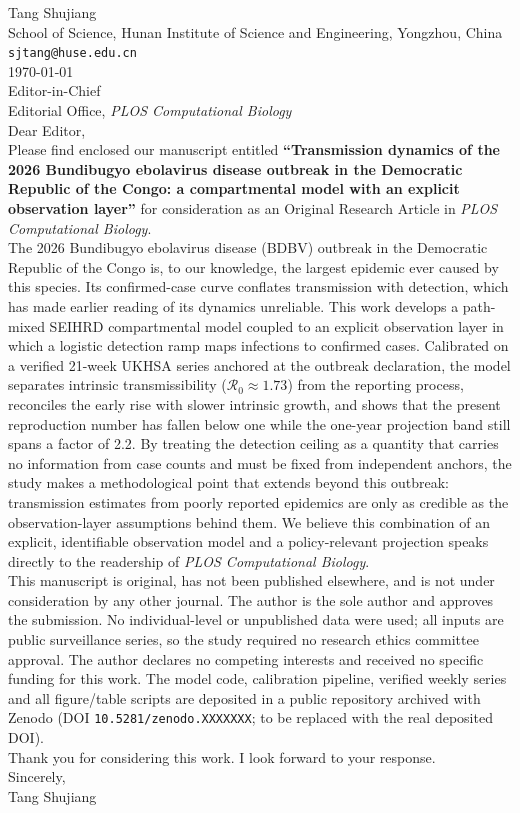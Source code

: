 \documentclass[11pt]{article}
\newcommand{\Reff}{\mathcal{R}}
\begin{document}
\noindent Tang Shujiang\\
School of Science, Hunan Institute of Science and Engineering, Yongzhou, China\\
\texttt{sjtang@huse.edu.cn}\\[1em]

\noindent \today\\[1em]

\noindent Editor-in-Chief\\
Editorial Office, \emph{PLOS Computational Biology}\\[1em]

\noindent Dear Editor,\\[1em]

\noindent Please find enclosed our manuscript entitled \textbf{``Transmission
dynamics of the 2026 Bundibugyo ebolavirus disease outbreak in the
Democratic Republic of the Congo: a compartmental model with an explicit
observation layer''} for consideration as an Original Research Article in
\emph{PLOS Computational Biology}.\\[1em]

The 2026 Bundibugyo ebolavirus disease (BDBV) outbreak in the Democratic
Republic of the Congo is, to our knowledge, the largest epidemic ever
caused by this species. Its confirmed-case curve conflates transmission
with detection, which has made earlier reading of its dynamics unreliable.
This work develops a path-mixed SEIHRD compartmental model coupled to an
explicit observation layer in which a logistic detection ramp maps
infections to confirmed cases. Calibrated on a verified 21-week UKHSA
series anchored at the outbreak declaration, the model separates
intrinsic transmissibility ($\Reff_0\approx1.73$) from the reporting
process, reconciles the early rise with slower intrinsic growth, and shows
that the present reproduction number has fallen below one while the
one-year projection band still spans a factor of 2.2. By treating the
detection ceiling as a quantity that carries no information from case
counts and must be fixed from independent anchors, the study makes a
methodological point that extends beyond this outbreak: transmission
estimates from poorly reported epidemics are only as credible as the
observation-layer assumptions behind them. We believe this combination of
an explicit, identifiable observation model and a policy-relevant
projection speaks directly to the readership of \emph{PLOS Computational
Biology}.\\[1em]

This manuscript is original, has not been published elsewhere, and is not
under consideration by any other journal. The author is the sole author
and approves the submission. No individual-level or unpublished data were
used; all inputs are public surveillance series, so the study required no
research ethics committee approval. The author declares no competing
interests and received no specific funding for this work. The model code,
calibration pipeline, verified weekly series and all figure/table scripts
are deposited in a public repository archived with Zenodo
(DOI \texttt{10.5281/zenodo.XXXXXXX}; to be replaced with the real
deposited DOI).\\[1em]

Thank you for considering this work. I look forward to your response.\\[1em]

\noindent Sincerely,\\[1em]

\noindent Tang Shujiang
\end{document}
